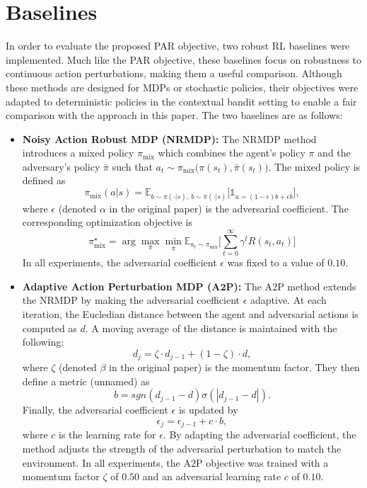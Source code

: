 \documentclass[./dissertation.tex]{subfiles}
\begin{document}
\section{Baselines}
\label{sec:baselines}
In order to evaluate the proposed PAR objective, two robust RL baselines were implemented. Much like the PAR objective, these baselines focus on robustness to continuous action perturbations, making them a useful comparison. Although these methods are designed for MDPs or stochastic policies, their objectives were adapted to deterministic policies in the contextual bandit setting to enable a fair comparison with the approach in this paper. The two baselines are as follows:
\begin{itemize}
    \item \textbf{Noisy Action Robust MDP (NRMDP):} The NRMDP \parencite{RobustActionMDP} method introduces a mixed policy $\pi_\text{mix}$ which combines the agent's policy $\pi$ and the adversary's policy $\bar{\pi}$ such that $a_t\sim\pi_\text{mix}\big(\pi(s_t), \bar{\pi}(s_t)\big)$. The mixed policy is defined as
    \[
    \pi_\text{mix}(a|s) = \mathbb{E}_{b\sim\pi(\cdot|s), \ \bar{b}\sim\bar{\pi}(\cdot|s)}
    \Big[\mathds{1}_{a=(1-\epsilon)b+\epsilon\bar{b}}\Big],
    \]
    where $\epsilon$ (denoted $\alpha$ in the original paper) is the adversarial coefficient. The corresponding optimization objective is
    \[
    \pi_{\text{mix}}^{\star} =
    \arg\max_\pi\min_{\bar{\pi}}\mathbb{E}_{a_t\sim\pi_\text{mix}}
    \Big[\sum_{t=0}^{\infty} \gamma^t R(s_t,a_t)\Big]
    \]
    In all experiments, the adversarial coefficient $\epsilon$ was fixed to a value of $0.10$.

    \item \textbf{Adaptive Action Perturbation MDP (A$\mathbf{2}$P):} The A$2$P \parencite{A2P} method extends the NRMDP by making the adversarial coefficient $\epsilon$ adaptive. At each iteration, the Eucledian distance between the agent and adversarial actions is computed as $d$. A moving average of the distance is maintained with the following: 
    \[
    d_j=\zeta \cdot d_{j-1}+(1-\zeta)\cdot d,
    \]
    where $\zeta$ (denoted $\beta$ in the original paper) is the momentum factor. They then define a metric (unnamed) as
    \[
    b=sgn(d_{j-1}-d)\sigma(|d_{j-1}-d|).
    \]
    Finally, the adversarial coefficient $\epsilon$ is updated by
    \[
    \epsilon_{j}=\epsilon_{j-1}+c\cdot b,
    \]
    where $c$ is the learning rate for $\epsilon$. By adapting the adversarial coefficient, the method adjusts the strength of the adversarial perturbation to match the environment. In all experiments, the A$2$P objective was trained with a momentum factor $\zeta$ of $0.50$ and an adversarial learning rate $c$ of $0.10$.
\end{itemize}
\end{document}
